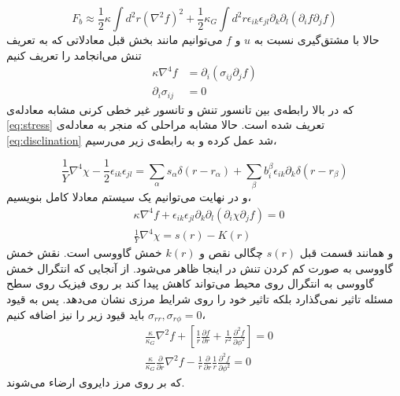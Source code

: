 \begin{equation}
F_b\approx\frac{1}{2}\kappa\int d^2r(\nabla^2 f)^2+\frac{1}{2}\kappa_G\int d^2r\epsilon_{ik}\epsilon_{jl}\partial_k\partial_l(\partial_if\partial_jf)
\end{equation}
حالا با مشتق‌گیری نسبت به $u$ و $f$
می‌توانیم مانند بخش قبل معادلاتی که به تعریف تنش می‌انجامد را تعریف کنیم
\begin{equation}
\begin{aligned}
\kappa\nabla^4f&=\partial_i(\sigma_{ij}\partial_jf)\\
\partial_i\sigma_{ij}&=0
\end{aligned}
\end{equation}
که در بالا رابطه‌ی بین تانسور تنش و تانسور غیر خطی کرنی مشابه معادله‌ی 
\ref{eq:stress}
تعریف شده است. حالا مشابه مراحلی که منجر به معادله‌ی 
\ref{eq:disclination}
شد عمل کرده و به رابطه‌ی زیر می‌رسیم،

\begin{equation}
\frac{1}{Y}\nabla^4\chi-\frac{1}{2}\epsilon_{ik}\epsilon_{jl}=\sum_\alpha s_\alpha\delta(r-r_\alpha)+\sum_\beta b_i^\beta\epsilon_{ik}\partial_k\delta(r-r_\beta)
\end{equation}
و در نهایت می‌توانیم یک سیستم معادلا کامل بنویسیم،
\begin{equation}
\begin{aligned}
&\kappa\nabla^4f+\epsilon_{ik}\epsilon_{jl}\partial_k\partial_l(\partial_i\chi\partial_jf)=0\\
&\frac{1}{Y}\nabla^4\chi=s(r)-K(r)
\end{aligned}
\end{equation}
و همانند قسمت قبل $s(r)$ چگالی نقص و 
$k(r)$
خمش گاووسی است. نقش خمش گاووسی به صورت کم کردن تنش در اینجا ظاهر می‌شود. از آنجایی که انتگرال خمش گاووسی به انتگرال روی محیط می‌تواند کاهش پیدا کند بر روی فیزیک روی سطح مسئله تاثیر نمی‌گذارد بلکه تاثیر خود را روی شرایط مرزی نشان می‌دهد. پس به قیود 
$\sigma_{rr},\sigma_{r\phi}=0$
باید قیود زیر را نیز اضافه کنیم،
\begin{equation}
\begin{aligned}
&\frac{\kappa}{\kappa_G}\nabla^2f+\left[\frac{1}{r}\frac{\partial f}{\partial r}+\frac{1}{r^2}\frac{\partial^2 f}{\partial\phi^2}\right]=0\\
&\frac{\kappa}{\kappa_G}\frac{\partial}{\partial r}\nabla^2f-\frac{1}{r}\frac{\partial}{\partial r}\frac{1}{r}\frac{\partial^2 f}{\partial\phi^2}=0
\end{aligned}
\end{equation}
که بر روی مرز دایروی ارضاء می‌شوند.


























